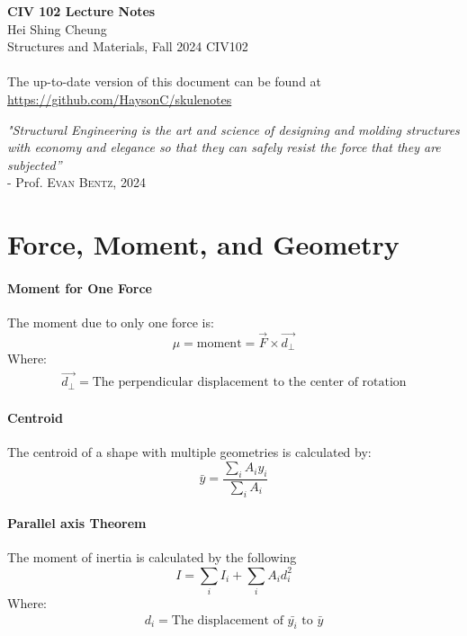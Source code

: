 \documentclass[11pt]{report}
\begin{document}
\thispagestyle{empty}
{\LARGE \bf CIV 102 Lecture Notes}\\
{\large Hei Shing Cheung}\\
Structures and Materials, Fall 2024 \hfill CIV102\\
\\
The up-to-date version of this document can be found at \url{https://github.com/HaysonC/skulenotes}\\

\begin{center}
\textit{"Structural Engineering is the art and science of designing and molding structures with economy and elegance so that they can safely resist the force that they are subjected''} \\ - Prof. \textsc{Evan Bentz, 2024}
\end{center}
\vspace{10pt}
\section{Force, Moment, and Geometry} 
    \paragraph{Moment for One Force} The moment due to only one force is:
    \begin{equation}
        \mu = \mathrm{moment} = \Vec{F}\times\Vec{d_\perp}
    \end{equation}
Where:
\begin{equation*}
\begin{split}
\Vec{d_\perp} = \text{The perpendicular displacement to the center of rotation}
\end{split}
\end{equation*}
\paragraph{Centroid} The centroid of a shape with multiple geometries is calculated by: 
\begin{equation}
\bar{y} = \frac{\sum_i A_i  y_i}{\sum_i A_i}
\end{equation}
\paragraph{Parallel axis Theorem} The moment of inertia is calculated by the following
\begin{equation}
    I = \sum_i I_{i} + \sum_i A_i d_i^2
\end{equation}
Where:
\begin{equation*}
\begin{split}
d_i = \text{The displacement of $\bar{y_i}$ to $\bar{y}$}
\end{split}
\end{equation*}
\end{document}
